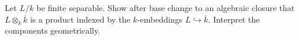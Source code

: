 \begin{problem}\label{chall:vi24-02}
Let $L/k$ be finite separable. Show after base change to an algebraic closure that $L\otimes_k\overline k$ is a product indexed by the $k$-embeddings $L\hookrightarrow\overline k$. Interpret the components geometrically.
\end{problem}
